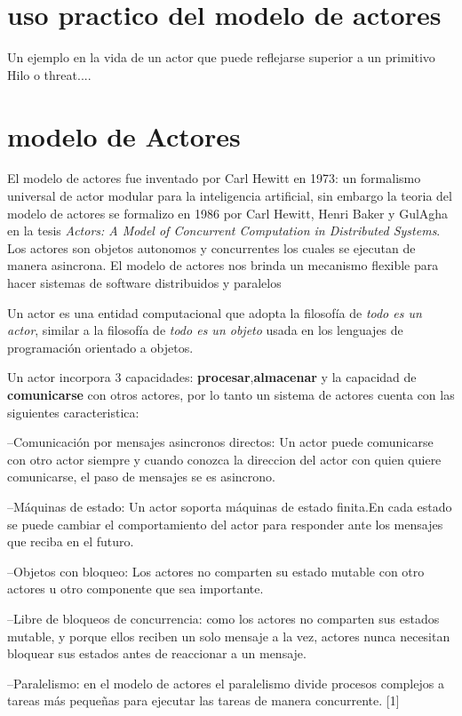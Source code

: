 \section{uso practico del modelo de actores}
Un ejemplo en la vida de un actor que puede reflejarse superior a un primitivo Hilo o threat....


\section{modelo de Actores}


El modelo de actores fue inventado por Carl Hewitt  en 1973: un formalismo
universal de actor modular para la inteligencia artificial, sin embargo la
teoria del modelo de actores se formalizo en 1986 por Carl Hewitt, Henri Baker y
GulAgha en la  tesis \emph{Actors: A Model of Concurrent Computation in
  Distributed Systems}. Los actores son objetos autonomos y concurrentes los
cuales se ejecutan de manera asincrona. El modelo de actores  nos brinda un
mecanismo flexible para  hacer sistemas de software  distribuidos y paralelos

Un actor es una entidad computacional que adopta la filosof\'ia de \emph{todo es un actor}, similar a la filosof\'ia de \emph{todo es un objeto} usada en los lenguajes de programaci\'on orientado a objetos.


Un actor  incorpora 3 capacidades: \textbf{procesar},\textbf{almacenar} y   la capacidad de \textbf{comunicarse} con otros actores, por lo tanto un sistema de actores cuenta con las siguientes caracteristica:

--Comunicaci\'on por mensajes asincronos directos: Un actor puede comunicarse con otro actor siempre y cuando conozca la direccion del actor con quien quiere comunicarse, el paso de mensajes se es asincrono.


--M\'aquinas de estado: Un actor soporta m\'aquinas de estado finita.En cada estado  se puede cambiar el comportamiento del actor para responder ante los mensajes que reciba en el futuro.

--Objetos con bloqueo: Los actores no comparten su estado mutable con otro actores u otro componente que sea importante.

--Libre de bloqueos de concurrencia: como los actores no comparten sus estados mutable, y porque ellos reciben un solo mensaje a la vez, actores nunca necesitan bloquear sus estados antes de reaccionar a un mensaje.

--Paralelismo: en el modelo de actores el paralelismo divide procesos complejos a tareas m\'as peque\~nas para ejecutar las tareas de manera concurrente. [1]



